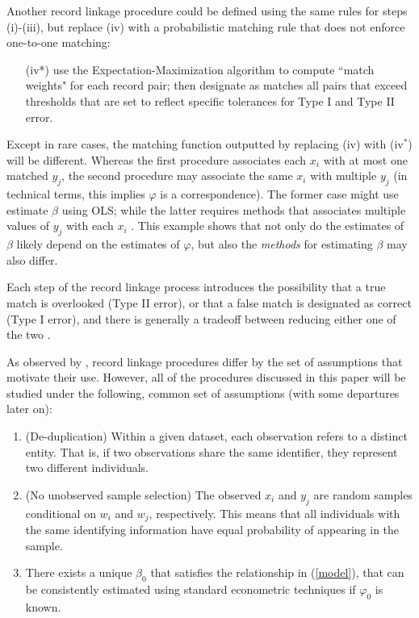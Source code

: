 \documentclass[12pt]{article}
\begin{document}
Another record linkage procedure could be defined using the same rules for steps (i)-(iii), but replace (iv) with a probabilistic matching rule that does not enforce one-to-one matching:
\begin{enumerate}
\item[(iv*)]  use the Expectation-Maximization algorithm to compute ``match weights" for each record pair; then designate as matches all pairs that exceed thresholds that are set to reflect specific tolerances for Type I and Type II error.
\end{enumerate} 

Except in rare cases, the matching function outputted by replacing (iv) with (iv$^*$) will be different.  Whereas the first procedure associates each $x_i$ with at most one matched $y_j$, the second procedure may associate the same $x_i$ with multiple $y_j$ (in technical terms, this implies $\varphi$ is a correspondence).  The former case might use  estimate $\beta$ using OLS; while the latter requires methods that associates multiple values of $y_j$ with each $x_i$ \citep{ahl2019}.  This example shows that not only do the estimates of $\beta$ likely depend on the estimates of $\varphi$, but also the \textit{methods} for estimating $\beta$ may also differ. 


Each step of the record linkage process introduces the possibility that a true match is overlooked (Type II error), or that a false match is designated as correct (Type I error), and there is generally a tradeoff between reducing either one of the two \citep{abe2019, harron2018}.


As observed by \cite{bailey2017}, record linkage procedures differ by the set of assumptions that motivate their use.  However, all of the procedures discussed in this paper will be studied under the following, common set of assumptions (with some departures later on):
\begin{enumerate}
\item (De-duplication) Within a given dataset, each observation refers to a distinct entity.  That is, if two observations share the same identifier, they represent two different individuals.
\item (No unobserved sample selection) The observed $x_i$ and $y_j$ are random samples conditional on $w_i$ and $w_j$, respectively.  This means that all individuals with the same identifying information have equal probability of appearing in the sample. 
\item There exists a unique $\beta_0$ that satisfies the relationship in (\ref{model}), that can be consistently estimated using standard econometric techniques if $\varphi_0$ is known.
\end{enumerate}
\end{document}

